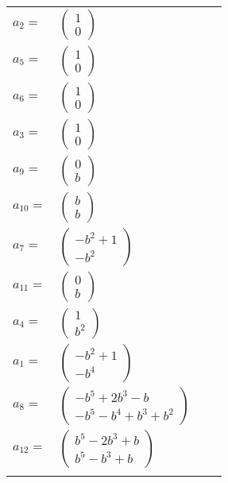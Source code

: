 \documentclass[1p]{elsarticle_modified}
\theoremstyle{definition}
\begin{document}
\begin{tabular}{m{7pt} m{180pt} m{7pt} m{180pt} }
\flushright $a_{2}=$&$\begin{pmatrix}1\\0\end{pmatrix}$ \\
\flushright $a_{5}=$&$\begin{pmatrix}1\\0\end{pmatrix}$ \\
\flushright $a_{6}=$&$\begin{pmatrix}1\\0\end{pmatrix}$ \\
\flushright $a_{3}=$&$\begin{pmatrix}1\\0\end{pmatrix}$ \\
\flushright $a_{9}=$&$\begin{pmatrix}0\\b\end{pmatrix}$ \\
\flushright $a_{10}=$&$\begin{pmatrix}b\\b\end{pmatrix}$ \\
\flushright $a_{7}=$&$\begin{pmatrix}- b^2+1\\- b^2\end{pmatrix}$ \\
\flushright $a_{11}=$&$\begin{pmatrix}0\\b\end{pmatrix}$ \\
\flushright $a_{4}=$&$\begin{pmatrix}1\\b^2\end{pmatrix}$ \\
\flushright $a_{1}=$&$\begin{pmatrix}- b^2+1\\- b^4\end{pmatrix}$ \\
\flushright $a_{8}=$&$\begin{pmatrix}- b^5+2 b^3- b\\- b^5- b^4+b^3+b^2\end{pmatrix}$ \\
\flushright $a_{12}=$&$\begin{pmatrix}b^5-2 b^3+b\\b^5- b^3+b\end{pmatrix}$\\&\end{tabular}
\end{document}
